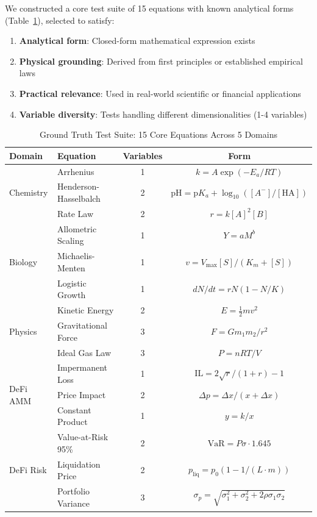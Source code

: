 \documentclass[twoside,11pt]{article}
\begin{document}
We constructed a core test suite of 15 equations with known analytical forms (Table~\ref{tab:ground_truth_suite}), selected to satisfy:

\begin{enumerate}
    \item \textbf{Analytical form}: Closed-form mathematical expression exists
    \item \textbf{Physical grounding}: Derived from first principles or established empirical laws
    \item \textbf{Practical relevance}: Used in real-world scientific or financial applications\citep{virtanen2020scipy}
    \item \textbf{Variable diversity}: Tests handling different dimensionalities (1-4 variables)
\end{enumerate}

\begin{table}[htbp]
\centering
\caption{Ground Truth Test Suite: 15 Core Equations Across 5 Domains}
\label{tab:ground_truth_suite}
\small
\begin{tabular}{llcc}
\toprule
\textbf{Domain} & \textbf{Equation} & \textbf{Variables} & \textbf{Form} \\
\midrule
\multirow{3}{*}{Chemistry}
& Arrhenius & 1 & $k = A\exp(-E_a/RT)$ \\
& Henderson-Hasselbalch & 2 & $\text{pH} = \text{p}K_a + \log_{10}([A^-]/[\text{HA}])$ \\
& Rate Law & 2 & $r = k[A]^2[B]$ \\
\midrule
\multirow{3}{*}{Biology}
& Allometric Scaling & 1 & $Y = aM^b$ \\
& Michaelis-Menten & 1 & $v = V_{\max}[S]/(K_m + [S])$ \\
& Logistic Growth & 1 & $dN/dt = rN(1-N/K)$ \\
\midrule
\multirow{3}{*}{Physics}
& Kinetic Energy & 2 & $E = \frac{1}{2}mv^2$ \\
& Gravitational Force & 3 & $F = Gm_1m_2/r^2$ \\
& Ideal Gas Law & 3 & $P = nRT/V$ \\
\midrule
\multirow{3}{*}{DeFi AMM}
& Impermanent Loss & 1 & $\text{IL} = 2\sqrt{r}/(1+r) - 1$ \\
& Price Impact & 2 & $\Delta p = \Delta x/(x + \Delta x)$ \\
& Constant Product & 1 & $y = k/x$ \\
\midrule
\multirow{3}{*}{DeFi Risk}
& Value-at-Risk 95\% & 2 & $\text{VaR} = P\sigma \cdot 1.645$ \\
& Liquidation Price & 2 & $p_{\text{liq}} = p_0(1 - 1/(L \cdot m))$ \\
& Portfolio Variance & 3 & $\sigma_p = \sqrt{\sigma_1^2 + \sigma_2^2 + 2\rho\sigma_1\sigma_2}$ \\
\bottomrule
\end{tabular}
\end{table}
\end{document}

